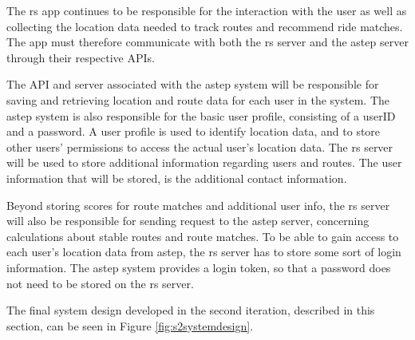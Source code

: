 The \gls{rs} app continues to be responsible for the interaction with the user as well as collecting the location data needed to track routes and recommend ride matches.
The app must therefore communicate with both the \gls{rs} server and the \gls{astep} server through their respective APIs.


The API and server associated with the \gls{astep} system will be responsible for saving and retrieving location and route data for each user in the system.
The \gls{astep} system is also responsible for the basic user profile, consisting of a userID and a password.
A user profile is used to identify location data, and to store other users' permissions to access the actual user's location data.
The \gls{rs} server will be used to store additional information regarding users and routes.
The user information that will be stored, is the additional contact information.

Beyond storing scores for route matches and additional user info, the \gls{rs} server will also be responsible for sending request to the \gls{astep} server, concerning calculations about stable routes and route matches.
To be able to gain access to each user's location data from \gls{astep}, the \gls{rs} server has to store some sort of login information.
The \gls{astep} system provides a login token, so that a password does not need to be stored on the \gls{rs} server.


The final system design developed in the second iteration, described in this section, can be seen in Figure \ref{fig:s2systemdesign}.

